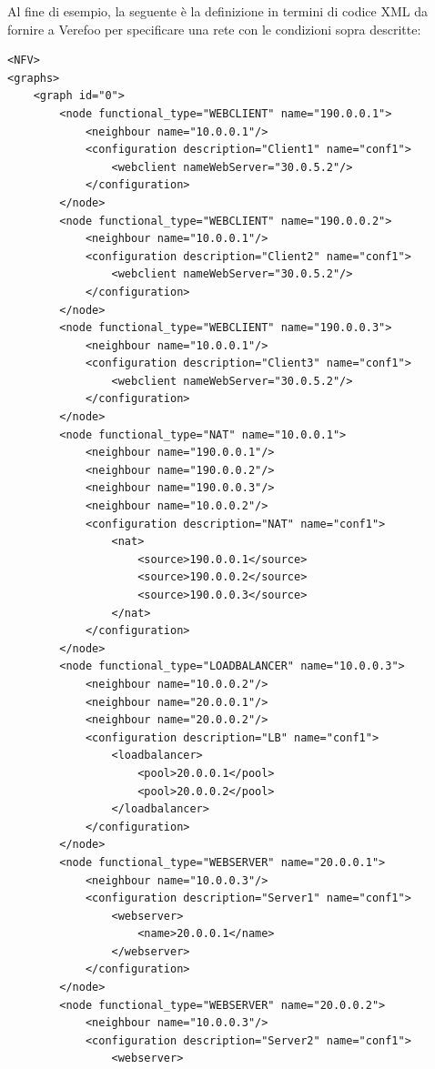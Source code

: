 Al fine di esempio, la seguente è la definizione in termini di codice XML da fornire a Verefoo per specificare una rete con le condizioni sopra descritte: 

\begin{lstlisting}[style=mystyle,caption={Definizione nodi del ServiceGraph \ref*{fig:Service_Graph}}]
<NFV>
<graphs>
    <graph id="0">
        <node functional_type="WEBCLIENT" name="190.0.0.1">
            <neighbour name="10.0.0.1"/>
            <configuration description="Client1" name="conf1">
                <webclient nameWebServer="30.0.5.2"/>
            </configuration>
        </node>
        <node functional_type="WEBCLIENT" name="190.0.0.2">
            <neighbour name="10.0.0.1"/>
            <configuration description="Client2" name="conf1">
                <webclient nameWebServer="30.0.5.2"/>
            </configuration>
        </node>
        <node functional_type="WEBCLIENT" name="190.0.0.3">
            <neighbour name="10.0.0.1"/>
            <configuration description="Client3" name="conf1">
                <webclient nameWebServer="30.0.5.2"/>
            </configuration>
        </node>
        <node functional_type="NAT" name="10.0.0.1">
            <neighbour name="190.0.0.1"/>
            <neighbour name="190.0.0.2"/>
            <neighbour name="190.0.0.3"/>
            <neighbour name="10.0.0.2"/>
            <configuration description="NAT" name="conf1">
                <nat>
                    <source>190.0.0.1</source>
                    <source>190.0.0.2</source>
                    <source>190.0.0.3</source>
                </nat>
            </configuration>
        </node>
        <node functional_type="LOADBALANCER" name="10.0.0.3">
            <neighbour name="10.0.0.2"/>
            <neighbour name="20.0.0.1"/>
            <neighbour name="20.0.0.2"/>
            <configuration description="LB" name="conf1">
                <loadbalancer>
                    <pool>20.0.0.1</pool>
                    <pool>20.0.0.2</pool>
                </loadbalancer>
            </configuration>
        </node>
        <node functional_type="WEBSERVER" name="20.0.0.1">
            <neighbour name="10.0.0.3"/>
            <configuration description="Server1" name="conf1">
                <webserver>
                    <name>20.0.0.1</name>
                </webserver>
            </configuration>
        </node>
        <node functional_type="WEBSERVER" name="20.0.0.2">
            <neighbour name="10.0.0.3"/>
            <configuration description="Server2" name="conf1">
                <webserver>

\end{lstlisting}
